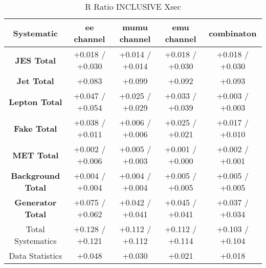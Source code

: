 \begin{table}[htbp]
\scriptsize
  \begin{center} 
  \begin{tabular}{|c|c|c|c|c|}
  \hline
   Systematic                            &  ee channel&  mumu channel&  emu channel&  combinaton\\
 \hline
\textbf{JES Total}                    &+0.018   / +0.030   & +0.014   / +0.014   & +0.018   / +0.030   & +0.018   / +0.030  \\
\textbf{Jet Total}                    &+0.083              & +0.099              & +0.092              & +0.093             \\
\textbf{Lepton Total}                 &+0.047   / +0.054   & +0.025   / +0.029   & +0.033   / +0.039   & +0.003   / +0.003  \\
\textbf{Fake Total}                   &+0.038   / +0.011   & +0.006   / +0.006   & +0.025   / +0.021   & +0.017   / +0.010  \\
\textbf{MET Total}                    &+0.002   / +0.006   & +0.005   / +0.003   & +0.001   / +0.000   & +0.002   / +0.001  \\
\textbf{Background Total}             &+0.004   / +0.004   & +0.004   / +0.004   & +0.005   / +0.005   & +0.005   / +0.005  \\
\textbf{Generator Total}              &+0.075   / +0.062   & +0.042   / +0.041   & +0.045   / +0.041   & +0.037   / +0.034  \\
  \hline
  \hline
Total Systematics                     &+0.128   / +0.121   & +0.112   / +0.112   & +0.112   / +0.114   & +0.103   / +0.104  \\
Data Statistics                       &+0.048              & +0.030              & +0.021              & +0.018             \\
  \hline
  \end{tabular}
  \end{center} 
  \label{tab:xsec_nominal_rratio}
  \caption{R Ratio INCLUSIVE Xsec}
\end{table}  
 
